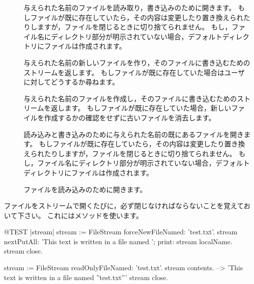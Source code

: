 \documentclass[a4paper,10pt,twoside]{book}
\begin{document}
\begin{description}

\item[] 与えられた名前のファイルを読み取り，書き込みのために開きます。
  もしファイルが既に存在していたら，その内容は変更したり置き換えられたりしますが，ファイルを閉じるときに切り捨てられません。
  もし，ファイル名にディレクトリ部分が明示されていない場合，デフォルトディレクトリにファイルは作成されます。
  
\item[] 与えられた名前の新しいファイルを作り，そのファイルに書き込むためのストリームを返します。
  もしファイルが既に存在していた場合はユーザに対してどうするか尋ねます。
  
\item[] 与えられた名前のファイルを作成し，そのファイルに書き込むためのストリームを返します。
  もしファイルが既に存在していた場合，新しいファイルを作成するかの確認をせずに古いファイルを消去します。

\item[] 読み込みと書き込みのために与えられた名前の既にあるファイルを開きます。
  もしファイルが既に存在していたら，その内容は変更したり置き換えられたりしますが，ファイルを閉じるときに切り捨てられません。
  もし，ファイル名にディレクトリ部分が明示されていない場合，デフォルトディレクトリにファイルは作成されます。

\item[] ファイルを読み込みのために開きます。

\end{description}

ファイルをストリームで開くたびに，必ず閉じなければならないことを覚えておいて下さい。
これにはメソッドを使います。


\begin{code}{@TEST |stream|}
stream := FileStream forceNewFileNamed: 'test.txt'.
stream
    nextPutAll: 'This text is written in a file named ';
    print: stream localName.
stream close.

stream := FileStream readOnlyFileNamed: 'test.txt'.
stream contents. --> 'This text is written in a file named ''test.txt'''
stream close.
\end{code}
\end{document}
